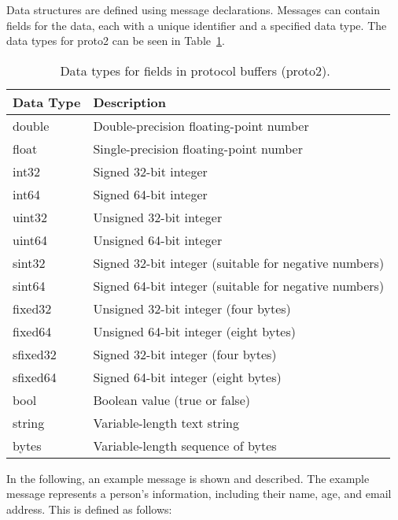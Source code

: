 \documentclass[../MasterThesis.tex]{subfiles}
\begin{document}
\begin{description}[font=\normalfont\color{RedViolet!80!black}, style=nextline]
	

\item[Messages and Fields] 

Data structures are defined using message declarations. Messages can contain fields for the data, each with a unique identifier and a specified data type. The data types for proto2 can be seen in Table~\ref{table:proto2_data_types}.~\cite{proto2_doc}


\begin{table}[H]
	\centering

	\begin{tabular}{ll}
		\toprule
		\textbf{Data Type} & \textbf{Description} \\
		\midrule
		double & Double-precision floating-point number \\
		float & Single-precision floating-point number \\
		int32 & Signed 32-bit integer \\
		int64 & Signed 64-bit integer \\
		uint32 & Unsigned 32-bit integer \\
		uint64 & Unsigned 64-bit integer \\
		sint32 & Signed 32-bit integer (suitable for negative numbers) \\
		sint64 & Signed 64-bit integer (suitable for negative numbers) \\
		fixed32 & Unsigned 32-bit integer (four bytes) \\
		fixed64 & Unsigned 64-bit integer (eight bytes) \\
		sfixed32 & Signed 32-bit integer (four bytes) \\
		sfixed64 & Signed 64-bit integer (eight bytes) \\
		bool & Boolean value (true or false) \\
		string & Variable-length text string  \\
		bytes & Variable-length sequence of bytes \\
		\bottomrule
	\end{tabular}
	\caption{Data types for fields in protocol buffers (proto2).~\cite{proto2_doc}}
	\label{table:proto2_data_types}
\end{table}

In the following, an example message is shown and described.
The example message represents a person's information, including their name, age, and email address. This is defined as follows:


\end{description}
\end{document}
